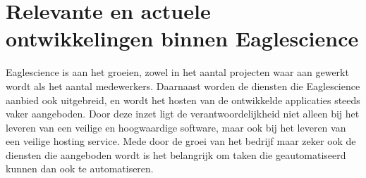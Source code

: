 \section{Relevante en actuele ontwikkelingen binnen Eaglescience}\label{sec:relevante-en-actuele-ontwikkelingen-binnen-eaglescience}
Eaglescience is aan het groeien, zowel in het aantal projecten waar aan gewerkt wordt als het aantal medewerkers.
Daarnaast worden de diensten die Eaglescience aanbied ook uitgebreid, en wordt het hosten van de ontwikkelde applicaties steeds vaker aangeboden.
Door deze inzet ligt de verantwoordelijkheid niet alleen bij het leveren van een veilige en hoogwaardige software, maar ook bij het leveren van een veilige hosting service.
Mede door de groei van het bedrijf maar zeker ook de diensten die aangeboden wordt is het belangrijk om taken die geautomatiseerd kunnen dan ook te automatiseren.
